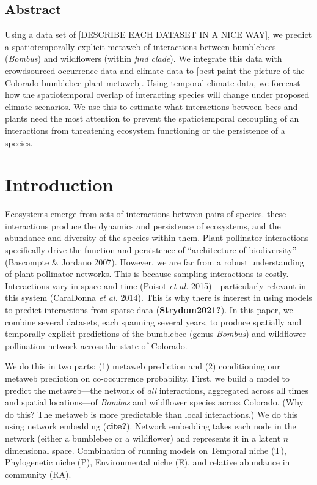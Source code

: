 \documentclass[11pt]{article}
\begin{document}
\vfill

\clearpage
\linenumbers
\pagestyle{normal}

\hypertarget{abstract}{%
\subsection{Abstract}\label{abstract}}

Using a data set of {[}DESCRIBE EACH DATASET IN A NICE WAY{]}, we
predict a spatiotemporally explicit metaweb of interactions between
bumblebees (\emph{Bombus}) and wildflowers (within \emph{find clade}).
We integrate this data with crowdsourced occurrence data and climate
data to {[}best paint the picture of the Colorado bumblebee-plant
metaweb{]}. Using temporal climate data, we forecast how the
spatiotemporal overlap of interacting species will change under proposed
climate scenarios. We use this to estimate what interactions between
bees and plants need the most attention to prevent the spatiotemporal
decoupling of an interactions from threatening ecosystem functioning or
the persistence of a species.

\hypertarget{introduction}{%
\section{Introduction}\label{introduction}}

Ecosystems emerge from sets of interactions between pairs of species.
these interactions produce the dynamics and persistence of ecosystems,
and the abundance and diversity of the species within them.
Plant-pollinator interactions specifically drive the function and
persistence of ``architecture of biodiversity'' (Bascompte \& Jordano
2007). However, we are far from a robust understanding of
plant-pollinator networks. This is because sampling interactions is
costly. Interactions vary in space and time (Poisot \emph{et al.}
2015)---particularly relevant in this system (CaraDonna \emph{et al.}
2014). This is why there is interest in using models to predict
interactions from sparse data (\textbf{Strydom2021?}). In this paper, we
combine several datasets, each spanning several years, to produce
spatially and temporally explicit predictions of the bumblebee (genus
\emph{Bombus}) and wildflower pollination network across the state of
Colorado.

We do this in two parts: (1) metaweb prediction and (2) conditioning our
metaweb prediction on co-occurrence probability. First, we build a model
to predict the metaweb---the network of \emph{all} interactions,
aggregated across all times and spatial locations---of \emph{Bombus} and
wildflower species across Colorado. (Why do this? The metaweb is more
predictable than local interactions.) We do this using network embedding
(\textbf{cite?}). Network embedding takes each node in the network
(either a bumblebee or a wildflower) and represents it in a latent \(n\)
dimensional space. Combination of running models on Temporal niche (T),
Phylogenetic niche (P), Environmental niche (E), and relative abundance
in community (RA).
\end{document}
